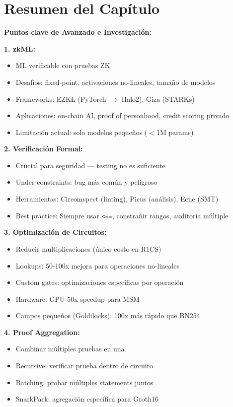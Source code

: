 \documentclass[11pt,a4paper,twoside]{book}
\begin{document}
\section{Resumen del Cap\'itulo}
\label{sec:resumen-cap5}

\begin{keyidea}
\textbf{Puntos clave de Avanzado e Investigaci\'on:}

\textbf{1. zkML:}
\begin{itemize}
    \item ML verificable con pruebas ZK
    \item Desaf\'ios: fixed-point, activaciones no-lineales, tama\~no de modelos
    \item Frameworks: EZKL (PyTorch $\to$ Halo2), Giza (STARKs)
    \item Aplicaciones: on-chain AI, proof of personhood, credit scoring privado
    \item Limitaci\'on actual: solo modelos peque\~nos ($<$1M params)
\end{itemize}

\textbf{2. Verificaci\'on Formal:}
\begin{itemize}
    \item Crucial para seguridad --- testing no es suficiente
    \item Under-constraints: bug m\'as com\'un y peligroso
    \item Herramientas: Circomspect (linting), Picus (an\'alisis), Ecne (SMT)
    \item Best practice: Siempre usar \texttt{<==}, constra\~nir rangos, auditor\'ia m\'ultiple
\end{itemize}

\textbf{3. Optimizaci\'on de Circuitos:}
\begin{itemize}
    \item Reducir multiplicaciones (\'unico costo en R1CS)
    \item Lookups: 50-100x mejora para operaciones no-lineales
    \item Custom gates: optimizaciones espec\'ificas por operaci\'on
    \item Hardware: GPU 50x speedup para MSM
    \item Campos peque\~nos (Goldilocks): 100x m\'as r\'apido que BN254
\end{itemize}

\textbf{4. Proof Aggregation:}
\begin{itemize}
    \item Combinar m\'ultiples pruebas en una
    \item Recursive: verificar prueba dentro de circuito
    \item Batching: probar m\'ultiples statements juntos
    \item SnarkPack: agregaci\'on espec\'ifica para Groth16
\end{itemize}


\end{keyidea}
\end{document}
